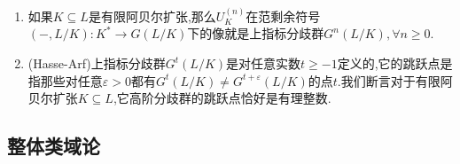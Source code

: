 \begin{enumerate}
\begin{proof}
		现在设$u=1+\varepsilon\pi^m$,其中$\varepsilon\in U_K$,设$\lambda\in F(n)-F(n-1)$,我们解释过$\lambda$是$L_n$的一个素元,并且有$\lambda^{\sigma}=[u]_F(\lambda)=F(\lambda,[\varepsilon\pi^m]_f(\lambda))$.倘若$m\ge n$,那么$\sigma=1$,此时$v_{L_n}(\lambda^{\sigma}-\lambda)=\infty$;倘若$m<n$,那么$\lambda_{n-m}=[\pi^m]_F(\lambda)$是$L_{n-m}$的素元,于是$[\varepsilon\pi^m]_F(\lambda)=[\varepsilon]_F(\lambda_{n-m})$也是$L_{n-m}$的素元.按照$L_{n-m}\subseteq L_n$是扩张次数为$q^m$的完全分歧扩张,可记$[\varepsilon\pi^m]_F(\lambda)=\varepsilon_0\lambda^{q^m}$,其中$\varepsilon_0\in U_{L_n}$.按照$F(X,0)=X$和$F(0,Y)=Y$,得到$F(X,Y)=X+Y+XYG(X,Y)$,其中$G(X,Y)\in\mathscr{O}_K[[X,Y]]$.于是$i_{L_n/K}(\sigma)=v_{L_n}(\lambda^{\sigma}-\lambda)$在$m<n$时取$q^m$,在$m\ge n$时取无穷.我们之前解释过$G_i(L_n/K)=\{\sigma\in G(L_n/K)\mid i_{L_n/K}(\sigma)\ge i+1\}$.设$q^{k-1}\le i\le q^k-1$,如果$u\in U_K^{(k)}$,那么$m\ge k$,也即$i_{L_n/K}(\sigma)\ge q^k\ge i+1$,于是$\sigma\in G_i(L_n/K)$,这说明$(U_K^{(k)},L_n/K)\subseteq G_i(L_n/K)$.反过来如果$\sigma\in G_i(L_n/K)$并且$\sigma\not=1$,那么$i_{L_n/K}(\sigma)=q^m>i\ge q^{k-1}$,于是$m\ge k$,于是$u\in U_K^{(k)}$,这证明了另一侧的包含关系.
	\end{proof}
	\item 如果$K\subseteq L$是有限阿贝尔扩张,那么$U_K^{(n)}$在范剩余符号$(-,L/K):K^*\to G(L/K)$下的像就是上指标分歧群$G^n(L/K),\forall n\ge0$.
	\item (Hasse-Arf)上指标分歧群$G^t(L/K)$是对任意实数$t\ge-1$定义的,它的跳跃点是指那些对任意$\varepsilon>0$都有$G^t(L/K)\not= G^{t+\varepsilon}(L/K)$的点$t$.我们断言对于有限阿贝尔扩张$K\subseteq L$,它高阶分歧群的跳跃点恰好是有理整数.
\end{enumerate}
\newpage
\subsection{整体类域论}

